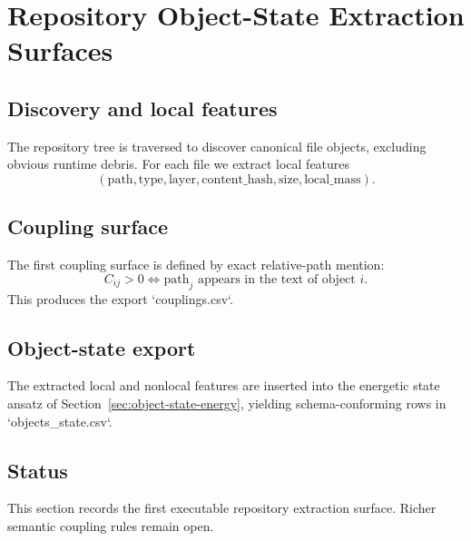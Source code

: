 \section{Repository Object-State Extraction Surfaces}
\label{sec:repo-object-state-extraction}

\subsection{Discovery and local features}
The repository tree is traversed to discover canonical file objects, excluding obvious runtime debris. For each file we extract local features
\begin{equation}
(\text{path},\text{type},\text{layer},\text{content\_hash},\text{size},\text{local\_mass}).
\end{equation}

\subsection{Coupling surface}
The first coupling surface is defined by exact relative-path mention:
\begin{equation}
C_{ij}>0 \iff \text{path}_j \text{ appears in the text of object } i.
\end{equation}
This produces the export `couplings.csv`.

\subsection{Object-state export}
The extracted local and nonlocal features are inserted into the energetic state ansatz of Section~\ref{sec:object-state-energy}, yielding schema-conforming rows in `objects_state.csv`.

\subsection{Status}
This section records the first executable repository extraction surface. Richer semantic coupling rules remain open.
